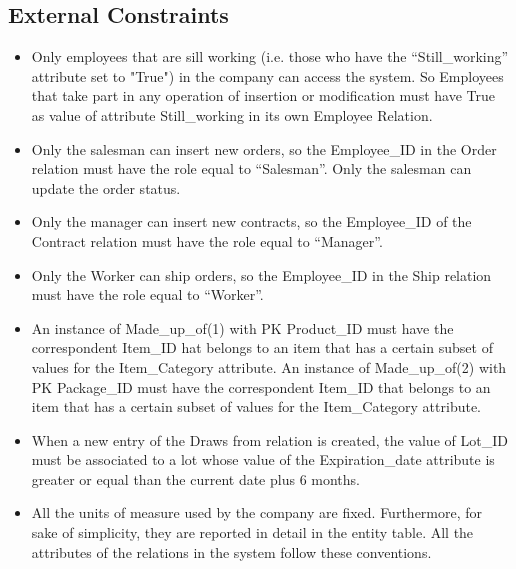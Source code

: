 \subsection{External Constraints}
\begin{itemize}
\item Only employees that are sill working (i.e. those who have the ``Still\_working'' attribute set to "True") in the company can access the system. So Employees that take part in any operation of insertion or modification must have True as value of attribute Still\_working in its own Employee Relation.
\item Only the salesman can insert new orders, so the Employee\_ID in the Order relation must have the role equal to ``Salesman''. Only the salesman can update the order status.
\item Only the manager can insert new contracts, so the Employee\_ID of the Contract relation must have the role equal to ``Manager''.
\item Only the Worker can ship orders, so the Employee\_ID in the Ship relation must have the role equal to ``Worker''.
\item An instance of Made\_up\_of(1) with PK Product\_ID must have the correspondent Item\_ID hat belongs to an item that has a certain subset of values for the Item\_Category attribute. An instance of Made\_up\_of(2) with PK Package\_ID must have the correspondent Item\_ID that belongs to an item that has a certain subset of values for the Item\_Category attribute.
\item When a new entry of the Draws from relation is created, the value of Lot\_ID must be associated to a lot whose value of the Expiration\_date attribute is greater or equal than the current date plus 6 months.
\item All the units of measure used by the company are fixed. Furthermore, for sake of simplicity, they are reported in detail in the entity table. All the attributes of the relations in the system follow these conventions.
\end{itemize}
